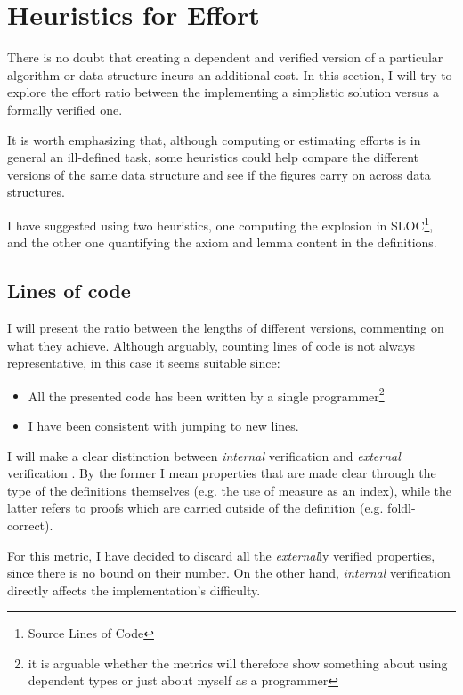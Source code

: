 \documentclass[12pt,twoside,notitlepage]{report}
\begin{document}
\section{Heuristics for Effort}

There is no doubt that creating a dependent and verified version of a particular algorithm or data structure incurs an additional cost. In this section, I will try to explore the effort ratio between the implementing a simplistic solution versus a formally verified one. 

It is worth emphasizing that, although computing or estimating efforts is in general an ill-defined task, some heuristics could help compare the different versions of the same data structure and see if the figures carry on across data structures.

I have suggested using two heuristics, one computing the explosion in SLOC\footnote{Source Lines of Code}, and the other one quantifying the axiom and lemma content in the definitions.

\subsection{Lines of code}

I will present the ratio between the lengths of different versions, commenting on what they achieve. Although arguably, counting lines of code is not always representative, in this case it seems suitable since: 
\begin{itemize}
\item All the presented code has been written by a single programmer\footnote{it is arguable whether the metrics will therefore show something about using dependent types or just about myself as a programmer}
\item I have been consistent with jumping to new lines.
\end{itemize}
	
I will make a clear distinction between \textit{internal} verification and \textit{external} verification \cite{verifagda}. By the former I mean properties that are made clear through the type of the definitions themselves (e.g. the use of measure as an index), while the latter refers to proofs which are carried outside of the definition (e.g. foldl-correct).

For this metric, I have decided to discard all the \textit{external}ly verified properties, since there is no bound on their number. On the other hand, \textit{internal} verification directly affects the implementation's difficulty.
\end{document}
